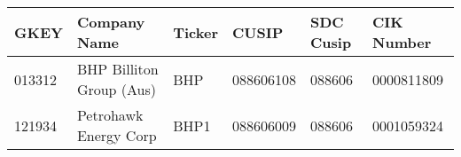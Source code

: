 

\begin{longtable}{ l l l l l l }\hline\hline
   GKEY &    Company Name &    Ticker &    CUSIP &    SDC Cusip &    CIK Number\\ 
\hline\endhead
   013312 &    BHP Billiton Group (Aus) &    BHP &    088606108 &    088606 &    0000811809\\ 
   121934 &    Petrohawk Energy Corp &    BHP1 &    088606009 &    088606 &    0001059324\\ 
\hline\hline\end{longtable}

